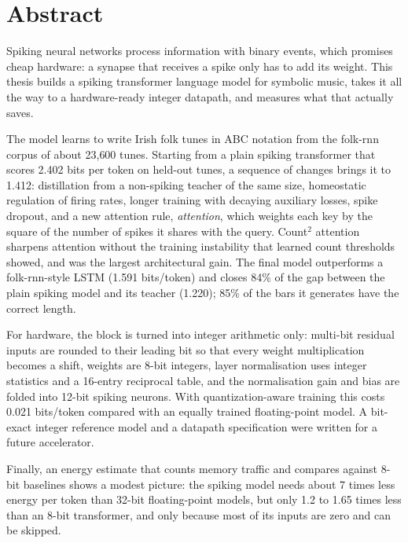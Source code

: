 \chapter*{Abstract}

Spiking neural networks process information with binary events, which promises cheap hardware: a synapse that
receives a spike only has to add its weight. This thesis builds a spiking transformer language model for
symbolic music, takes it all the way to a hardware-ready integer datapath, and measures what that actually saves.

The model learns to write Irish folk tunes in ABC notation from the folk-rnn corpus of about 23{,}600 tunes.
Starting from a plain spiking transformer that scores 2.402 bits per token on held-out tunes, a sequence of
changes brings it to 1.412: distillation from a non-spiking teacher of the same size, homeostatic regulation of
firing rates, longer training with decaying auxiliary losses, spike dropout, and a new attention rule,
\emph{\csq{} attention}, which weights each key by the square of the number of spikes it shares with the query.
Count$^2$ attention sharpens attention without the training instability that learned count thresholds showed, and
was the largest architectural gain. The final model outperforms a folk-rnn-style LSTM (1.591 bits/token) and
closes 84\% of the gap between the plain spiking model and its teacher (1.220); 85\% of the bars it generates have
the correct length.

For hardware, the block is turned into integer arithmetic only: multi-bit residual inputs are rounded to their
leading bit so that every weight multiplication becomes a shift, weights are 8-bit integers, layer normalisation
uses integer statistics and a 16-entry reciprocal table, and the normalisation gain and bias are folded into
12-bit spiking neurons. With quantization-aware training this costs 0.021 bits/token compared with an equally
trained floating-point model. A bit-exact integer reference model and a datapath specification were written for
a future accelerator.

Finally, an energy estimate that counts memory traffic and compares against 8-bit baselines shows a modest
picture: the spiking model needs about 7 times less energy per token than 32-bit floating-point models, but only
1.2 to 1.65 times less than an 8-bit transformer, and only because most of its inputs are zero and can be skipped.
